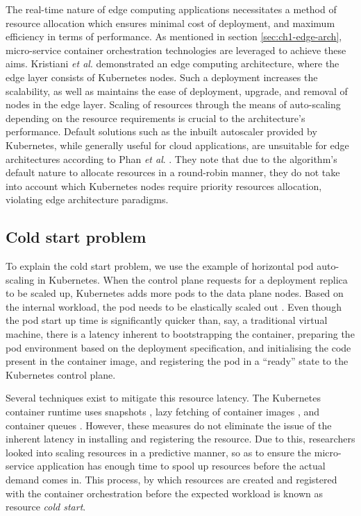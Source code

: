 The real-time nature of edge computing applications necessitates a method of resource allocation which ensures minimal cost of deployment, and maximum efficiency in terms of performance. As mentioned in section \ref{sec:ch1-edge-arch}, micro-service container orchestration technologies are leveraged to achieve these aims. Kristiani \textit{et al}. \cite{kristiani2019} demonstrated an edge computing architecture, where the edge layer consists of Kubernetes nodes. Such a deployment increases the scalability, as well as maintains the ease of deployment, upgrade, and removal of nodes in the edge layer. Scaling of resources through the means of auto-scaling depending on the resource requirements is crucial to the architecture's performance. Default solutions such as the inbuilt autoscaler provided by Kubernetes, while generally useful for cloud applications, are unsuitable for edge architectures according to Phan \textit{et al}. \cite{phan2022traffic}. They note that due to the algorithm's default nature to allocate resources in a round-robin manner, they do not take into account which Kubernetes nodes require priority resources allocation, violating edge architecture paradigms.

\subsection{Cold start problem}
\label{subsec:ch3-cold-start}

To explain the cold start problem, we use the example of horizontal pod auto-scaling in Kubernetes. When the control plane requests for a deployment replica to be scaled up, Kubernetes adds more pods to the data plane nodes.  Based on the internal workload, the pod needs to be elastically scaled out \cite{beni2021reducing}. Even though the pod start up time is significantly quicker than, say, a traditional virtual machine, there is a latency inherent to bootstrapping the container, preparing the pod environment based on the deployment specification, and initialising the code present in the container image, and registering the pod in a ``ready'' state to the Kubernetes control plane.\par

Several techniques exist to mitigate this resource latency. The Kubernetes container runtime uses snapshots \cite{cadden2019seuss}, lazy fetching of container images \cite{lorenzo2019fogdocker}, and container queues \cite{lin2019mitigating}. However, these measures do not eliminate the issue of the inherent latency in installing and registering the resource. Due to this, researchers looked into scaling resources in a predictive manner, so as to ensure the micro-service application has enough time to spool up resources before the actual demand comes in. This process, by which resources are created and registered with the container orchestration before the expected workload is known as resource \textit{cold start}.\par

